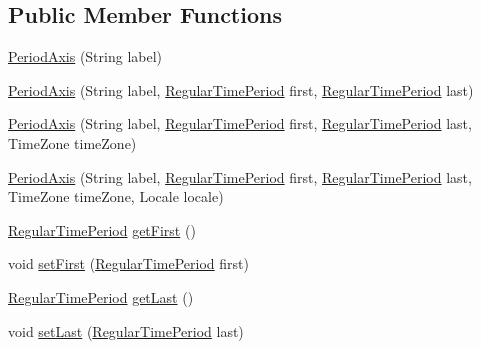 \subsection*{Public Member Functions}
\begin{DoxyCompactItemize}
\item 
\mbox{\hyperlink{classorg_1_1jfree_1_1chart_1_1axis_1_1_period_axis_ae87599520fff923c5cc556643ff87f2e}{Period\+Axis}} (String label)
\item 
\mbox{\hyperlink{classorg_1_1jfree_1_1chart_1_1axis_1_1_period_axis_a13de8634c2f1f9ca271895aa594164f2}{Period\+Axis}} (String label, \mbox{\hyperlink{classorg_1_1jfree_1_1data_1_1time_1_1_regular_time_period}{Regular\+Time\+Period}} first, \mbox{\hyperlink{classorg_1_1jfree_1_1data_1_1time_1_1_regular_time_period}{Regular\+Time\+Period}} last)
\item 
\mbox{\hyperlink{classorg_1_1jfree_1_1chart_1_1axis_1_1_period_axis_a2918db5c06e54c3bfe98917844671d18}{Period\+Axis}} (String label, \mbox{\hyperlink{classorg_1_1jfree_1_1data_1_1time_1_1_regular_time_period}{Regular\+Time\+Period}} first, \mbox{\hyperlink{classorg_1_1jfree_1_1data_1_1time_1_1_regular_time_period}{Regular\+Time\+Period}} last, Time\+Zone time\+Zone)
\item 
\mbox{\hyperlink{classorg_1_1jfree_1_1chart_1_1axis_1_1_period_axis_a433140ccdda68ace0780bdd9ebd55177}{Period\+Axis}} (String label, \mbox{\hyperlink{classorg_1_1jfree_1_1data_1_1time_1_1_regular_time_period}{Regular\+Time\+Period}} first, \mbox{\hyperlink{classorg_1_1jfree_1_1data_1_1time_1_1_regular_time_period}{Regular\+Time\+Period}} last, Time\+Zone time\+Zone, Locale locale)
\item 
\mbox{\hyperlink{classorg_1_1jfree_1_1data_1_1time_1_1_regular_time_period}{Regular\+Time\+Period}} \mbox{\hyperlink{classorg_1_1jfree_1_1chart_1_1axis_1_1_period_axis_a71641826c0fbb76457131a4c11642b1f}{get\+First}} ()
\item 
void \mbox{\hyperlink{classorg_1_1jfree_1_1chart_1_1axis_1_1_period_axis_aea013f046586d10f0300581343caeabe}{set\+First}} (\mbox{\hyperlink{classorg_1_1jfree_1_1data_1_1time_1_1_regular_time_period}{Regular\+Time\+Period}} first)
\item 
\mbox{\hyperlink{classorg_1_1jfree_1_1data_1_1time_1_1_regular_time_period}{Regular\+Time\+Period}} \mbox{\hyperlink{classorg_1_1jfree_1_1chart_1_1axis_1_1_period_axis_abc4bc9a48d98ead7b3e24031ac001ea2}{get\+Last}} ()
\item 
void \mbox{\hyperlink{classorg_1_1jfree_1_1chart_1_1axis_1_1_period_axis_a018f27da82444f306b9757c4be7a5cc8}{set\+Last}} (\mbox{\hyperlink{classorg_1_1jfree_1_1data_1_1time_1_1_regular_time_period}{Regular\+Time\+Period}} last)

\end{DoxyCompactItemize}

